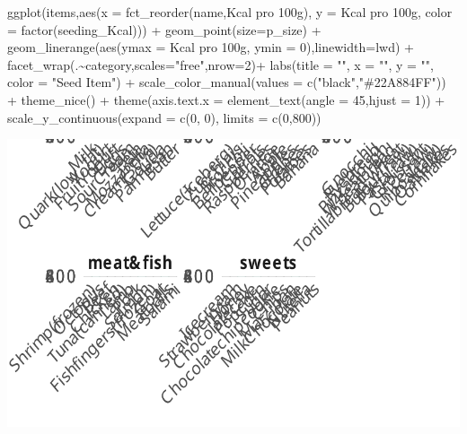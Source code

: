 \documentclass[
  letterpaper,
  DIV=11,
  numbers=noendperiod]{scrartcl}
\newenvironment{Shaded}{\begin{snugshade}}{\end{snugshade}}
\newcommand{\AttributeTok}[1]{\textcolor[rgb]{0.40,0.45,0.13}{#1}}
\newcommand{\DecValTok}[1]{\textcolor[rgb]{0.68,0.00,0.00}{#1}}
\newcommand{\FunctionTok}[1]{\textcolor[rgb]{0.28,0.35,0.67}{#1}}
\newcommand{\NormalTok}[1]{\textcolor[rgb]{0.00,0.23,0.31}{#1}}
\newcommand{\SpecialCharTok}[1]{\textcolor[rgb]{0.37,0.37,0.37}{#1}}
\newcommand{\StringTok}[1]{\textcolor[rgb]{0.13,0.47,0.30}{#1}}
\begin{document}
\begin{Shaded}
\begin{Highlighting}[]
\FunctionTok{ggplot}\NormalTok{(items,}\FunctionTok{aes}\NormalTok{(}\AttributeTok{x =} \FunctionTok{fct\_reorder}\NormalTok{(name,}\StringTok{\textasciigrave{}}\AttributeTok{Kcal pro 100g}\StringTok{\textasciigrave{}}\NormalTok{),}
                 \AttributeTok{y =} \StringTok{\textasciigrave{}}\AttributeTok{Kcal pro 100g}\StringTok{\textasciigrave{}}\NormalTok{,}
                 \AttributeTok{color =} \FunctionTok{factor}\NormalTok{(seeding\_Kcal))) }\SpecialCharTok{+}
  \FunctionTok{geom\_point}\NormalTok{(}\AttributeTok{size=}\NormalTok{p\_size) }\SpecialCharTok{+}
  \FunctionTok{geom\_linerange}\NormalTok{(}\FunctionTok{aes}\NormalTok{(}\AttributeTok{ymax =} \StringTok{\textasciigrave{}}\AttributeTok{Kcal pro 100g}\StringTok{\textasciigrave{}}\NormalTok{, }\AttributeTok{ymin =} \DecValTok{0}\NormalTok{),}\AttributeTok{linewidth=}\NormalTok{lwd) }\SpecialCharTok{+}
  \FunctionTok{facet\_wrap}\NormalTok{(.}\SpecialCharTok{\textasciitilde{}}\NormalTok{category,}\AttributeTok{scales=}\StringTok{"free"}\NormalTok{,}\AttributeTok{nrow=}\DecValTok{2}\NormalTok{)}\SpecialCharTok{+}
  \FunctionTok{labs}\NormalTok{(}\AttributeTok{title =} \StringTok{""}\NormalTok{,}
       \AttributeTok{x     =} \StringTok{""}\NormalTok{,}
       \AttributeTok{y     =} \StringTok{""}\NormalTok{,}
       \AttributeTok{color =} \StringTok{"Seed Item"}\NormalTok{) }\SpecialCharTok{+}
  \FunctionTok{scale\_color\_manual}\NormalTok{(}\AttributeTok{values =} \FunctionTok{c}\NormalTok{(}\StringTok{"black"}\NormalTok{,}\StringTok{"\#22A884FF"}\NormalTok{)) }\SpecialCharTok{+}
  \FunctionTok{theme\_nice}\NormalTok{() }\SpecialCharTok{+}
  \FunctionTok{theme}\NormalTok{(}\AttributeTok{axis.text.x =} \FunctionTok{element\_text}\NormalTok{(}\AttributeTok{angle =} \DecValTok{45}\NormalTok{,}\AttributeTok{hjust =} \DecValTok{1}\NormalTok{)) }\SpecialCharTok{+}
  \FunctionTok{scale\_y\_continuous}\NormalTok{(}\AttributeTok{expand =} \FunctionTok{c}\NormalTok{(}\DecValTok{0}\NormalTok{, }\DecValTok{0}\NormalTok{), }\AttributeTok{limits =} \FunctionTok{c}\NormalTok{(}\DecValTok{0}\NormalTok{,}\DecValTok{800}\NormalTok{))}
\end{Highlighting}
\end{Shaded}

\includegraphics{items_files/figure-pdf/unnamed-chunk-9-1.pdf}
\end{document}
